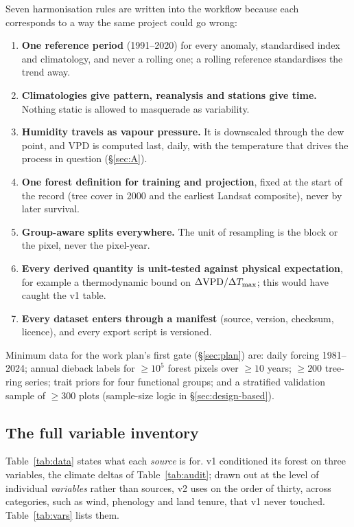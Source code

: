 Seven harmonisation rules are written into the workflow because each corresponds to a way the same project could go wrong:
\begin{enumerate}
\item \textbf{One reference period} (1991--2020) for every anomaly, standardised index and climatology, and never a rolling one; a rolling reference standardises the trend away.
\item \textbf{Climatologies give pattern, reanalysis and stations give time.} Nothing static is allowed to masquerade as variability.
\item \textbf{Humidity travels as vapour pressure.} It is downscaled through the dew point, and VPD is computed last, daily, with the temperature that drives the process in question (\S\ref{sec:A}).
\item \textbf{One forest definition for training and projection}, fixed at the start of the record (tree cover in 2000 and the earliest Landsat composite), never by later survival.
\item \textbf{Group-aware splits everywhere.} The unit of resampling is the block or the pixel, never the pixel-year.
\item \textbf{Every derived quantity is unit-tested against physical expectation}, for example a thermodynamic bound on $\Delta\mathrm{VPD}/\Delta T_{\max}$; this would have caught the v1 table.
\item \textbf{Every dataset enters through a manifest} (source, version, checksum, licence), and every export script is versioned.
\end{enumerate}
Minimum data for the work plan's first gate (\S\ref{sec:plan}) are: daily forcing 1981--2024; annual dieback labels for $\ge10^5$ forest pixels over $\ge10$ years; $\ge200$ tree-ring series; trait priors for four functional groups; and a stratified validation sample of $\ge300$ plots (sample-size logic in \S\ref{sec:design-based}).

\FloatBarrier
\subsection{The full variable inventory}\label{sec:vars}
Table~\ref{tab:data} states what each \emph{source} is for. v1 conditioned its forest on three variables, the climate deltas of Table~\ref{tab:audit}; drawn out at the level of individual \emph{variables} rather than sources, v2 uses on the order of thirty, across categories, such as wind, phenology and land tenure, that v1 never touched. Table~\ref{tab:vars} lists them.


